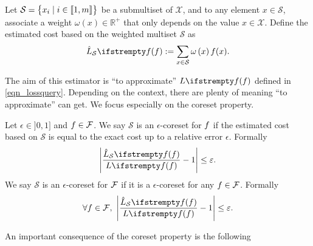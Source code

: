 Let $\mathcal{S}=\begin{Bmatrix}
x_{i} \mid i\in \llbracket 1,m \rrbracket
\end{Bmatrix}$ be a submultiset of $\mathcal{X}$, and to any element $x \in \mathcal{S}$, associate a weight $\omega\left(x\right) \in \mathbb{R}^{+}$ that only depends on the value $x \in  \mathcal{X}$. Define the estimated cost based on the weighted multiset $\mathcal{S}$ as
\begin{equation*}
    \estloss{\mathcal{S}}{\query}:=\sum_{x \in \mathcal{S}} \omega\left(x\right) \query(x).
\end{equation*}

The aim of this estimator is ``to approximate'' $\loss{\query}$ defined in \cref{eqn_lossquery}. Depending on the context, there are plenty of meaning ``to approximate'' can get. We focus especially on the coreset property.
\begin{tcolorbox}
    
    \begin{definition}[Coreset]
        \label{def_coresetprop}
        Let $\epsilon \in {]}0,1{]}$ and $f \in \mathcal{F}$. We say $\mathcal{S}$ is an $\epsilon$-coreset for $f$ if the estimated cost based on $\mathcal{S}$ is equal to the exact cost up to a relative error $\epsilon$. Formally
        \begin{equation}
            \label{eqn_querycoresetprop}
            \left|\frac{\estloss{\mathcal{S}}{\query}}{\loss{\query}}-1\right| \le \epsilon.
        \end{equation}
        We say $\mathcal{S}$ is an $\epsilon$-coreset for $\mathcal{F}$ if it is a $\epsilon$-coreset for any $f \in \mathcal{F}$. Formally
        \begin{equation}
            \label{eqn_qsetcoresetprop}
            \forall \query \in \qset,\ \left|\frac{\estloss{\mathcal{S}}{\query}}{\loss{\query}}-1\right| \le \epsilon.
        \end{equation}
    \end{definition}
\end{tcolorbox}

An important consequence of the coreset property is the following

